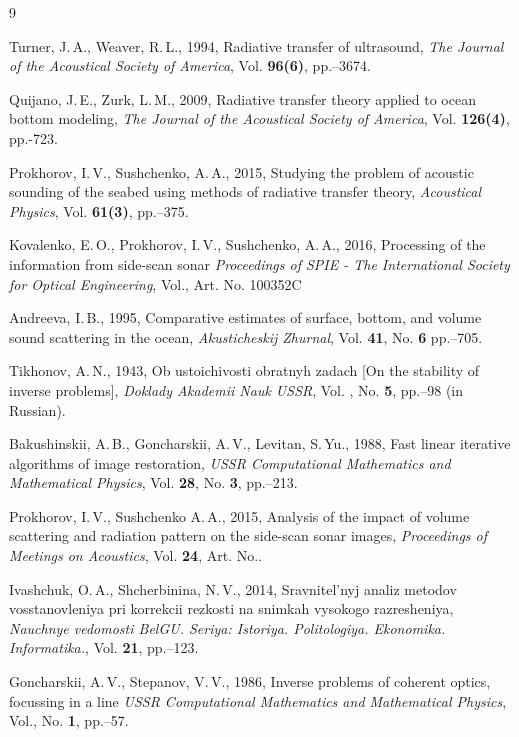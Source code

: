 \documentclass{procDDs}
\begin{document}
\begin {thebibliography}{9}

 Turner, J.\,A., Weaver, R.\,L., 1994, 
Radiative transfer of ultrasound, 
\emph{The Journal of the Acoustical Society of America},  
Vol.\; {\bf 96(6)}, pp.--3674.

 Quijano, J.\,E., Zurk, L.\,M., 2009, 
Radiative transfer theory applied to ocean bottom modeling, 
\emph{The Journal of the Acoustical Society of America},  
Vol.\; {\bf 126(4)}, pp.-723.

  Prokhorov, I.\,V., Sushchenko, A.\,A., 2015, 
Studying the problem of acoustic sounding of the seabed using methods of radiative transfer theory, 
\emph{Acoustical Physics},
Vol.\; {\bf 61(3)}, pp.--375.

 Kovalenko, E.\,O., Prokhorov, I.\,V., Sushchenko, A.\,A., 2016,
Processing of the information from side-scan sonar
\emph{Proceedings of SPIE - The International Society for Optical Engineering},
Vol., Art. No. \;100352C

 Andreeva,  I.\,B., 1995,
Comparative estimates of surface, bottom, and volume sound scattering in the ocean,
\emph{Akusticheskij Zhurnal},
Vol.\; {\bf 41}, No. {\bf 6} pp.--705.

 Tikhonov, A.\,N., 1943, 
Ob ustoichivosti obratnyh zadach [On the stability of inverse problems], 
\emph{Doklady Akademii Nauk USSR}, 
Vol. , No. {\bf 5}, pp.--98 (in Russian).

 Bakushinskii, A.\,B., Goncharskii, A.\,V., Levitan, S.\,Yu., 1988,
Fast linear iterative algorithms of image restoration,
\emph{USSR Computational Mathematics and Mathematical Physics},
Vol.\; {\bf 28}, No. { \bf 3},  pp.--213.

 Prokhorov, I.\,V., Sushchenko A.\,A., 2015,
Analysis of the impact of volume scattering and radiation pattern on the side-scan sonar images, 
\emph{Proceedings of Meetings on Acoustics},
Vol.\; {\bf 24}, Art. No..

 Ivashchuk, O.\,A., Shcherbinina, N.\,V., 2014,
Sravnitel'nyj analiz metodov vosstanovleniya pri korrekcii rezkosti na snimkah vysokogo razresheniya, 
\emph{Nauchnye vedomosti BelGU. Seriya: Istoriya. Politologiya. Ekonomika. Informatika.},
Vol.\; {\bf 21}, pp.--123.

  Goncharskii, A.\,V., Stepanov, V.\,V., 1986,
Inverse problems of coherent optics, focussing in a line
\emph{USSR Computational Mathematics and Mathematical Physics},
Vol., No. {\bf 1},  pp.--57.


\end{thebibliography}
\end{document}
